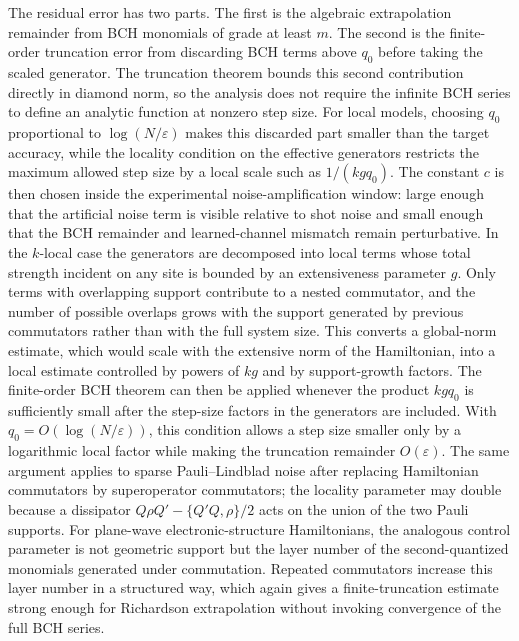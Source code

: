 \documentclass[aps,pra,reprint,superscriptaddress]{revtex4-2}
\newcommand{\eps}{\varepsilon}
\begin{document}
The residual error has two parts.
The first is the algebraic extrapolation remainder from BCH monomials of grade at least $m$.
The second is the finite-order truncation error from discarding BCH terms above $q_0$ before taking the scaled generator.
The truncation theorem bounds this second contribution directly in diamond norm, so the analysis does not require the infinite BCH series to define an analytic function at nonzero step size.
For local models, choosing $q_0$ proportional to $\log(N/\eps)$ makes this discarded part smaller than the target accuracy, while the locality condition on the effective generators restricts the maximum allowed step size by a local scale such as $1/(k g q_0)$.
The constant $c$ is then chosen inside the experimental noise-amplification window: large enough that the artificial noise term is visible relative to shot noise and small enough that the BCH remainder and learned-channel mismatch remain perturbative.
In the $k$-local case the generators are decomposed into local terms whose total strength incident on any site is bounded by an extensiveness parameter $g$.
Only terms with overlapping support contribute to a nested commutator, and the number of possible overlaps grows with the support generated by previous commutators rather than with the full system size.
This converts a global-norm estimate, which would scale with the extensive norm of the Hamiltonian, into a local estimate controlled by powers of $kg$ and by support-growth factors.
The finite-order BCH theorem can then be applied whenever the product $kgq_0$ is sufficiently small after the step-size factors in the generators are included.
With $q_0=O(\log(N/\eps))$, this condition allows a step size smaller only by a logarithmic local factor while making the truncation remainder $O(\eps)$.
The same argument applies to sparse Pauli--Lindblad noise after replacing Hamiltonian commutators by superoperator commutators; the locality parameter may double because a dissipator $Q\rho Q'-\{Q'Q,\rho\}/2$ acts on the union of the two Pauli supports.
For plane-wave electronic-structure Hamiltonians, the analogous control parameter is not geometric support but the layer number of the second-quantized monomials generated under commutation.
Repeated commutators increase this layer number in a structured way, which again gives a finite-truncation estimate strong enough for Richardson extrapolation without invoking convergence of the full BCH series.
\end{document}
